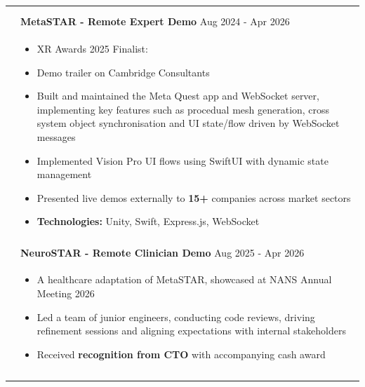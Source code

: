 \documentclass[11pt]{article}
\begin{document}
\begin{minipage}[t][0pt]{\linewidth}
\begin{tabular}[t]{p{2cm} p{14cm}}
\begin{itemize}
	               \end{itemize}                                         \\ & \\ &

	               \textbf{MetaSTAR - Remote Expert Demo}   \hfill Aug 2024 - Apr 2026                                                                                                                                                                 \\ &
	               \begin{itemize}
		               \renewcommand{\labelitemi}{$\diamond$}
		               \item XR Awards 2025 Finalist: \href{https://xrawards.aixr.org/winners-and-finalists-2025/}{\color{Blue}{Best Technical Achievement}}
		               \item Demo trailer on Cambridge Consultants \href{https://vimeo.com/1133112584/e91686d260?share=copy&fl=cl&fe=ci}{\color{Blue}{Vimeo}}
		               \item Built and maintained the Meta Quest app and WebSocket server, implementing key features such as procedual mesh generation, cross system object synchronisation and UI state/flow driven by WebSocket messages
		               \item Implemented Vision Pro UI flows using SwiftUI with dynamic state management
		               \item Presented live demos externally to \textbf{15+} companies across market sectors
		               \item \textbf{Technologies:} Unity, Swift, Express.js, WebSocket
	               \end{itemize} \\ & \\ &


	               \textbf{NeuroSTAR - Remote Clinician Demo}  \hfill Aug 2025 - Apr 2026                                                                                                                                                              \\ &
	               \begin{itemize}
		               \renewcommand{\labelitemi}{$\diamond$}
		               \item A healthcare adaptation of MetaSTAR, showcased at NANS Annual Meeting 2026
		               \item Led a team of junior engineers, conducting code reviews, driving refinement sessions and aligning expectations with internal stakeholders
		               \item Received \textbf{recognition from CTO} with accompanying cash award
	               \end{itemize}                                                                     \\ & \\ &
	\end{tabular}
\end{minipage}
\end{document}
